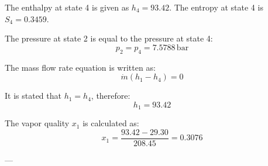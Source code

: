 The enthalpy at state 4 is given as \( h_4 = 93.42 \). The entropy at state 4 is \( S_4 = 0.3459 \).  

The pressure at state 2 is equal to the pressure at state 4:  
\[
p_2 = p_4 = 7.5788 \, \text{bar}
\]  

The mass flow rate equation is written as:  
\[
\dot{m}(h_1 - h_4) = 0
\]  

It is stated that \( h_1 = h_4 \), therefore:  
\[
h_1 = 93.42
\]  

The vapor quality \( x_1 \) is calculated as:  
\[
x_1 = \frac{93.42 - 29.30}{208.45} = 0.3076
\]  

---